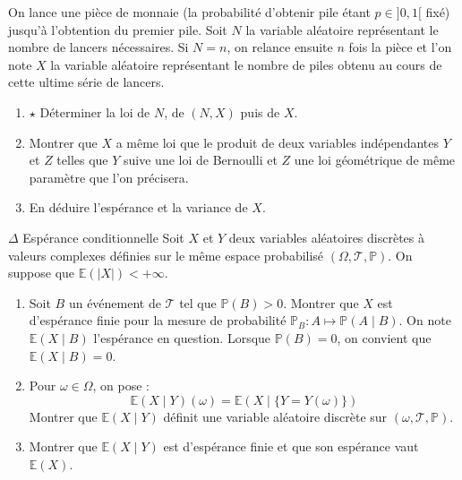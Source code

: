 \documentclass[french,a4paper]{article}
\renewcommand{\P}{\mathbb{P}}
\newcommand{\E}{\mathbb{E}}
\theoremstyle{plain}
\theoremstyle{definition}
\theoremstyle{remark}
\begin{document}
\begin{ex}[Moulin.53]{}
	On lance une pièce de monnaie (la probabilité d'obtenir pile étant $p\in]0,1[$ fixé) jusqu'à l'obtention du premier pile. Soit $N$ la variable aléatoire représentant le nombre de lancers nécessaires. Si $N=n$, on relance ensuite $n$ fois la pièce et l'on note $X$ la variable aléatoire représentant le nombre de piles obtenu au cours de cette ultime série de lancers.
	\begin{enumerate}
		\item $\star$ Déterminer la loi de $N$, de $(N,X)$ puis de $X$.
		\item Montrer que $X$ a même loi que le produit de deux variables indépendantes $Y$ et $Z$ telles que $Y$ suive une loi de Bernoulli et $Z$ une loi géométrique de même paramètre que l'on précisera.
		\item En déduire l'espérance et la variance de $X$.
	\end{enumerate}
\end{ex}

\begin{ex}[Moulin.54]{$\Delta$ Espérance conditionnelle}
	Soit $X$ et $Y$ deux variables aléatoires discrètes à valeurs complexes définies sur le même espace probabilisé $(\Omega,\mathcal{T},\P)$. On suppose que $\E(\lvert X\rvert)<+\infty$.
	\begin{enumerate}
		\item Soit $B$ un événement de $\mathcal{T}$ tel que $\P(B)>0$. Montrer que $X$ est d'espérance finie pour la mesure de probabilité $\P_B:A\mapsto\P(A\mid B)$. On note $\E(X\mid B)$ l'espérance en question. Lorsque $\P(B)=0$, on convient que $\E(X\mid B)=0$.
		\item Pour $\omega\in\Omega$, on pose : $$\E(X\mid Y)(\omega)=\E(X\mid \{Y=Y(\omega)\})$$ Montrer que $\E(X\mid Y)$ définit une variable aléatoire discrète sur $(\omega,\mathcal{T},\P)$.
		\item Montrer que $\E(X\mid Y)$ est d'espérance finie et que son espérance vaut $\E(X)$.
	\end{enumerate}
\end{ex}
\end{document}
